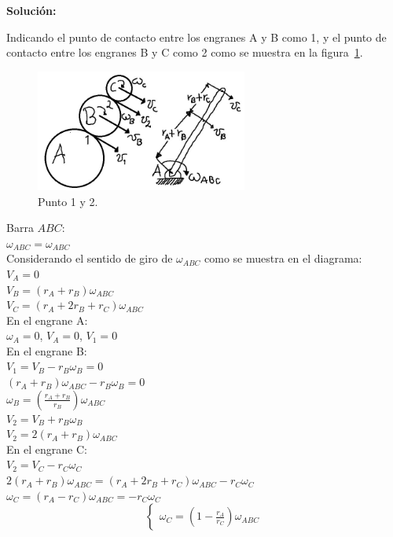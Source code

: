 \documentclass[a4paper,11pt]{scrartcl}
\begin{document}
\textbf{Solución:}

Indicando el punto de contacto entre los engranes A y B como 1, y el punto de contacto entre los engranes B y C como 2 como se muestra en la figura~\ref{fig:39_2}.\\

\begin{figure}[H]
  \centering
  \includegraphics[height=4cm]{39_2}
  \caption{Punto 1 y 2.}
  \label{fig:39_2}
\end{figure}

\begin{center}
Barra $ABC$: \\
\hfill \break
$\omega_{ABC} = \omega_{ABC}$\\
\hfill \break
Considerando el sentido de giro de $\omega_{ABC}$ como se muestra en el diagrama:\\
\hfill \break
$V_A = 0$\\
\hfill \break
$V_B = (r_A + r_B) \omega_{ABC}$\\
\hfill \break
$V_C = (r_A + 2r_B + r_C) \omega_{ABC}$\\
\hfill \break
En el engrane A:\\
\hfill \break
$\omega_A = 0$, $V_A = 0$, $V_1 = 0$\\
\hfill \break
En el engrane B:\\
\hfill \break
$V_1 = V_B - r_B \omega_B = 0$\\
\hfill \break
$(r_A + r_B) \omega_{ABC} - r_B \omega_B = 0$\\
\hfill \break
$\omega_B = ( \frac{ r_A + r_B}{r_B} ) \omega_{ABC}$\\
\hfill \break
$V_2 = V_B + r_B \omega_B$\\
\hfill \break
$V_2 = 2(r_A + r_B) \omega_{ABC}$\\
\hfill \break
En el engrane C:\\
\hfill \break
$V_2 = V_C - r_C \omega_C$\\
\hfill \break
$2(r_A + r_B) \omega_{ABC} = (r_A + 2r_B + r_C) \omega_{ABC} - r_C \omega_C$\\
\hfill \break
$\omega_C = (r_A - r_C) \omega_{ABC} = -r_C \omega_C$\\
\begin{equation*}
  \left\lbrace
  \begin{array}{l}
    \omega_C = (1 - \frac{r_A}{r_C}) \omega_{ABC}
  \end{array}
  \right.
\end{equation*}


\end{center}
\end{document}
